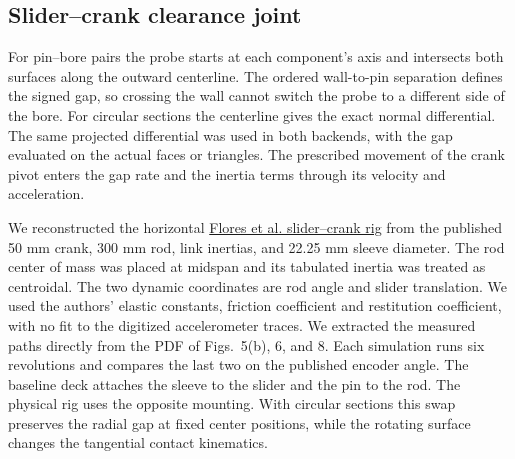 \subsection{Slider--crank clearance joint}
\label{sec:external-contact-cases}

For pin--bore pairs the probe starts at each component's axis and intersects
both surfaces along the outward centerline. The ordered wall-to-pin separation
defines the signed gap, so crossing the wall cannot switch the probe to a
different side of the bore. For circular sections the centerline gives the
exact normal differential. The same projected differential was used in both
backends, with the gap evaluated on the actual faces or triangles. The
prescribed movement of the crank pivot enters the gap rate and the inertia
terms through its velocity and acceleration.

We reconstructed the horizontal \href{https://doi.org/10.1007/s11071-010-9899-8}{Flores et al. slider--crank rig}
from the published 50 mm crank, 300 mm rod, link inertias, and 22.25 mm sleeve
diameter. The rod center of mass was placed at midspan and its tabulated
inertia was treated as centroidal. The two dynamic
coordinates are rod angle and slider translation. We used the authors'
elastic constants, friction coefficient and restitution coefficient, with
no fit to the digitized accelerometer traces. We extracted the measured
paths directly from the PDF of Figs.~5(b), 6, and 8. Each simulation runs six
revolutions and compares the last two on the published encoder angle.
The baseline deck attaches the sleeve to the slider and the pin to the
rod. The physical rig uses the opposite mounting. With circular sections
this swap preserves the radial gap at fixed center positions, while the
rotating surface changes the tangential contact kinematics.

